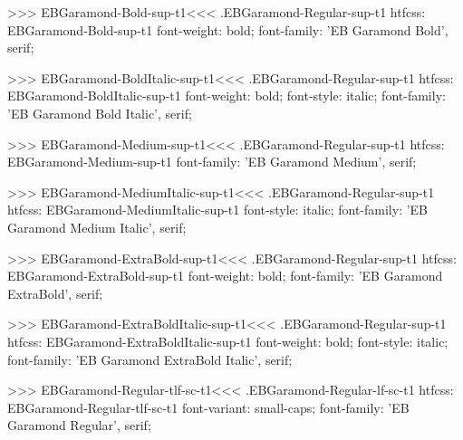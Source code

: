 {{{{{{{>>>
\<EBGaramond-Bold-sup-t1\><<<
.EBGaramond-Regular-sup-t1
htfcss:  EBGaramond-Bold-sup-t1  font-weight: bold; font-family: 'EB Garamond Bold', serif;

>>>
\<EBGaramond-BoldItalic-sup-t1\><<<
.EBGaramond-Regular-sup-t1
htfcss:  EBGaramond-BoldItalic-sup-t1  font-weight: bold; font-style: italic; font-family: 'EB Garamond Bold Italic', serif;

>>>
\<EBGaramond-Medium-sup-t1\><<<
.EBGaramond-Regular-sup-t1
htfcss:  EBGaramond-Medium-sup-t1  font-family: 'EB Garamond Medium', serif;

>>>
\<EBGaramond-MediumItalic-sup-t1\><<<
.EBGaramond-Regular-sup-t1
htfcss:  EBGaramond-MediumItalic-sup-t1  font-style: italic; font-family: 'EB Garamond Medium Italic', serif;

>>>
\<EBGaramond-ExtraBold-sup-t1\><<<
.EBGaramond-Regular-sup-t1
htfcss:  EBGaramond-ExtraBold-sup-t1  font-weight: bold; font-family: 'EB Garamond ExtraBold', serif;

>>>
\<EBGaramond-ExtraBoldItalic-sup-t1\><<<
.EBGaramond-Regular-sup-t1
htfcss:  EBGaramond-ExtraBoldItalic-sup-t1  font-weight: bold; font-style: italic; font-family: 'EB Garamond ExtraBold Italic', serif;

>>>
\<EBGaramond-Regular-tlf-sc-t1\><<<
.EBGaramond-Regular-lf-sc-t1
htfcss:  EBGaramond-Regular-tlf-sc-t1  font-variant: small-caps; font-family: 'EB Garamond Regular', serif;

}}}}}}}
